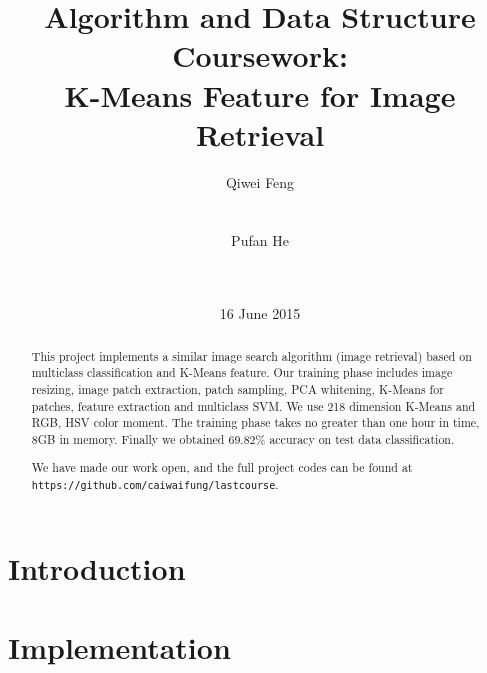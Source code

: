 \documentclass{acm_proc_article-sp}
\begin{document}
\title{Algorithm and Data Structure Coursework: \\K-Means Feature for
Image Retrieval}
\subtitle{}
%
%
\author{\alignauthor
Qiwei Feng\\
       \\
       \\
\alignauthor
Pufan He\\
       \\
       \\
}
\date{16 June 2015}

\maketitle
\begin{abstract}
        This project implements a similar image search algorithm (image
        retrieval) based on multiclass classification and K-Means feature. Our
        training phase includes image resizing, image patch extraction, patch
        sampling, PCA whitening, K-Means for patches, feature extraction and
        multiclass SVM. We use 218 dimension K-Means and RGB, HSV color moment.
        The training phase takes no greater than one hour in time, 8GB in memory.
        Finally we obtained 69.82\% accuracy on test data classification.

We have made our work open, and the full project codes can be found at
\texttt{https://github.com/caiwaifung/lastcourse}.
\end{abstract}


\section{Introduction}

\section{Implementation}
\end{document}
